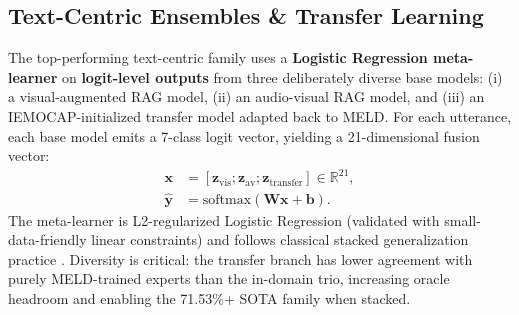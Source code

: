 \documentclass[11pt,a4paper,twocolumn]{article}
\begin{document}
\subsection{Text-Centric Ensembles \& Transfer Learning}
The top-performing text-centric family uses a \textbf{Logistic Regression meta-learner} on \textbf{logit-level outputs} from three deliberately diverse base models: (i) a visual-augmented RAG model, (ii) an audio-visual RAG model, and (iii) an IEMOCAP-initialized transfer model adapted back to MELD. For each utterance, each base model emits a 7-class logit vector, yielding a 21-dimensional fusion vector:
\begin{equation}
\begin{split}
\mathbf{x} &= [\mathbf{z}_{\mathrm{vis}};\mathbf{z}_{\mathrm{av}};\mathbf{z}_{\mathrm{transfer}}] \in \mathbb{R}^{21},\\
\hat{\mathbf{y}} &= \mathrm{softmax}(\mathbf{W}\mathbf{x} + \mathbf{b}).
\end{split}
\end{equation}
The meta-learner is L2-regularized Logistic Regression (validated with small-data-friendly linear constraints) and follows classical stacked generalization practice \cite{wolpert1992,breiman1996stacked}. Diversity is critical: the transfer branch has lower agreement with purely MELD-trained experts than the in-domain trio, increasing oracle headroom and enabling the 71.53\%+ SOTA family when stacked.
\end{document}
